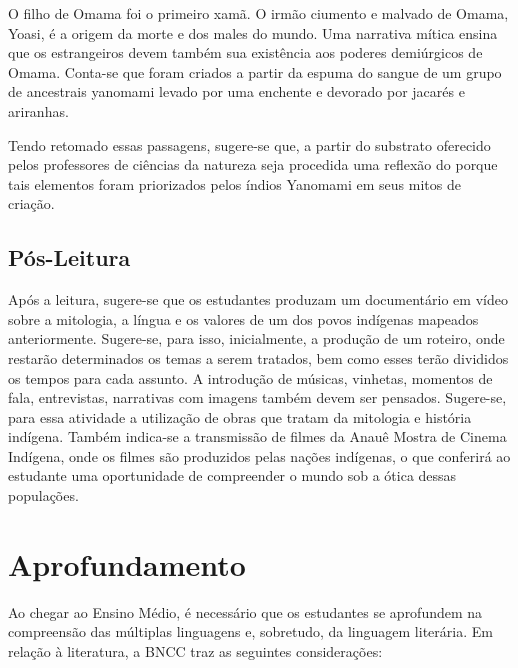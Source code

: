 \documentclass[12pt]{extarticle}
\begin{document}
O filho de Omama foi o primeiro xamã. O irmão ciumento e malvado de Omama,
Yoasi, é a origem da morte e dos males do mundo.
Uma narrativa mítica ensina que os estrangeiros devem também sua
existência aos poderes demiúrgicos de Omama. Conta-se que foram criados
a partir da espuma do sangue de um grupo de ancestrais yanomami levado
por uma enchente e devorado por jacarés e ariranhas.

Tendo retomado essas passagens, sugere-se que, a partir do
substrato oferecido pelos professores de ciências da natureza seja
procedida uma reflexão do porque tais elementos foram priorizados pelos
índios Yanomami em seus mitos de criação.


\subsection{Pós-Leitura}

 Após a leitura, sugere-se que os estudantes produzam um
documentário em vídeo sobre a mitologia, a língua e os valores de um dos
povos indígenas mapeados anteriormente. Sugere-se, para isso,
inicialmente, a produção de um roteiro, onde restarão determinados os
temas a serem tratados, bem como esses terão divididos os tempos para
cada assunto. A introdução de músicas, vinhetas, momentos de fala,
entrevistas, narrativas com imagens também devem ser pensados.
Sugere-se, para essa atividade a utilização de obras que tratam da
mitologia e história indígena. Também indica-se a transmissão de filmes
da Anauê Mostra de Cinema Indígena, onde os filmes são produzidos pelas
nações indígenas, o que conferirá ao estudante uma oportunidade de
compreender o mundo sob a ótica dessas populações. 


\section{Aprofundamento}

Ao chegar ao Ensino Médio, é necessário que os estudantes se aprofundem
na compreensão das múltiplas linguagens e, sobretudo, da linguagem
literária. Em relação à literatura, a BNCC traz as seguintes
considerações:
\end{document}
